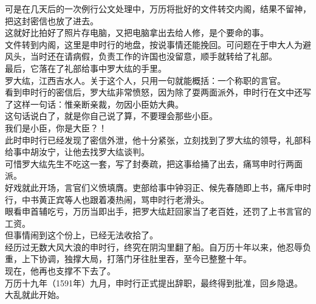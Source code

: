 \begin{multicols}{\theparacolNo}
可是在几天后的一次例行公文处理中，万历将批好的文件转交内阁，结果不留神，把这封密信也放了进去。\\

这就好比拍好了照片存电脑，又把电脑拿出去给人修，是个要命的事。\\

文件转到内阁，这里是申时行的地盘，按说事情还能挽回。可问题在于申大人为避风头，当时还在请病假，负责工作的许国也没留意，顺手就转给了礼部。\\

最后，它落在了礼部给事中罗大纮的手里。\\

罗大纮，江西吉水人。关于这个人，只用一句就能概括：一个称职的言官。\\

看到申时行的密信后，罗大纮非常愤怒，因为除了耍两面派外，申时行在文中还写了这样一句话：惟亲断亲裁，勿因小臣妨大典。\\

这句话说白了，就是你自己说了算，不要理会那些小臣。\\

我们是小臣，你是大臣？！\\

此时申时行已经发现了密信外泄，他十分紧张，立刻找到了罗大纮的领导，礼部科给事中胡汝宁，让他去找罗大纮谈判。\\

可惜罗大纮先生不吃这一套，写了封奏疏，把这事给捅了出去，痛骂申时行两面派。\\

好戏就此开场，言官们义愤填膺。吏部给事中钟羽正、候先春随即上书，痛斥申时行，中书黄正宾等人也跟着凑热闹，骂申时行老滑头。\\

眼看申首辅吃亏，万历当即出手，把罗大纮赶回家当了老百姓，还罚了上书言官的工资。\\

但事情闹到这个份上，已经无法收拾了。\\

经历过无数大风大浪的申时行，终究在阴沟里翻了船。自万历十年以来，他忍辱负重，上下协调，独撑大局，打落门牙往肚里吞，至今已整整十年。\\

现在，他再也支撑不下去了。\\

万历十九年（1591年）九月，申时行正式提出辞职，最终得到批准，回乡隐退。\\

大乱就此开始。\\

\ifnum{}
	\end{multicols}
\fi
\newpage
